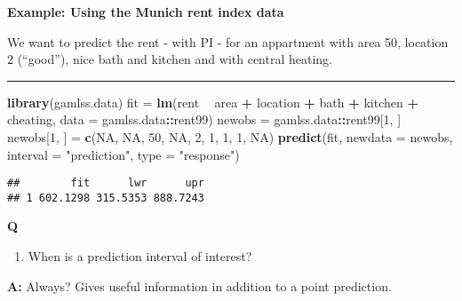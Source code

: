 \documentclass[]{article}
\newenvironment{Shaded}{\begin{snugshade}}{\end{snugshade}}
\newcommand{\DataTypeTok}[1]{\textcolor[rgb]{0.13,0.29,0.53}{#1}}
\newcommand{\DecValTok}[1]{\textcolor[rgb]{0.00,0.00,0.81}{#1}}
\newcommand{\KeywordTok}[1]{\textcolor[rgb]{0.13,0.29,0.53}{\textbf{#1}}}
\newcommand{\NormalTok}[1]{#1}
\newcommand{\OperatorTok}[1]{\textcolor[rgb]{0.81,0.36,0.00}{\textbf{#1}}}
\newcommand{\OtherTok}[1]{\textcolor[rgb]{0.56,0.35,0.01}{#1}}
\newcommand{\StringTok}[1]{\textcolor[rgb]{0.31,0.60,0.02}{#1}}
\providecommand{\tightlist}{%
  \setlength{\itemsep}{0pt}\setlength{\parskip}{0pt}}
\begin{document}
\textbf{Example: Using the Munich rent index data}

We want to predict the rent - with PI - for an appartment with area 50,
location 2 (``good''), nice bath and kitchen and with central heating.

\begin{center}\rule{0.5\linewidth}{\linethickness}\end{center}

\footnotesize

\begin{Shaded}
\begin{Highlighting}[]
\KeywordTok{library}\NormalTok{(gamlss.data)}
\NormalTok{fit =}\StringTok{ }\KeywordTok{lm}\NormalTok{(rent }\OperatorTok{~}\StringTok{ }\NormalTok{area }\OperatorTok{+}\StringTok{ }\NormalTok{location }\OperatorTok{+}\StringTok{ }\NormalTok{bath }\OperatorTok{+}\StringTok{ }\NormalTok{kitchen }\OperatorTok{+}\StringTok{ }\NormalTok{cheating, }\DataTypeTok{data =}\NormalTok{ gamlss.data}\OperatorTok{::}\NormalTok{rent99)}
\NormalTok{newobs =}\StringTok{ }\NormalTok{gamlss.data}\OperatorTok{::}\NormalTok{rent99[}\DecValTok{1}\NormalTok{, ]}
\NormalTok{newobs[}\DecValTok{1}\NormalTok{, ] =}\StringTok{ }\KeywordTok{c}\NormalTok{(}\OtherTok{NA}\NormalTok{, }\OtherTok{NA}\NormalTok{, }\DecValTok{50}\NormalTok{, }\OtherTok{NA}\NormalTok{, }\DecValTok{2}\NormalTok{, }\DecValTok{1}\NormalTok{, }\DecValTok{1}\NormalTok{, }\DecValTok{1}\NormalTok{, }\OtherTok{NA}\NormalTok{)}
\KeywordTok{predict}\NormalTok{(fit, }\DataTypeTok{newdata =}\NormalTok{ newobs, }\DataTypeTok{interval =} \StringTok{"prediction"}\NormalTok{, }\DataTypeTok{type =} \StringTok{"response"}\NormalTok{)}
\end{Highlighting}
\end{Shaded}

\begin{verbatim}
##        fit      lwr      upr
## 1 602.1298 315.5353 888.7243
\end{verbatim}

\normalsize

\textbf{Q}

\begin{enumerate}
\def\labelenumi{\arabic{enumi}.}
\tightlist
\item
  When is a prediction interval of interest?
\end{enumerate}

\textbf{A:} Always? Gives useful information in addition to a point
prediction.
\end{document}
